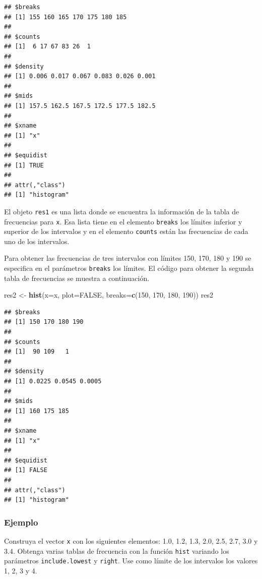 \documentclass[10pt,]{krantz}
\makeatletter
\newenvironment{Shaded}{\begin{snugshade}}{\end{snugshade}}
\newcommand{\KeywordTok}[1]{\textcolor[rgb]{0.13,0.29,0.53}{\textbf{#1}}}
\newcommand{\DataTypeTok}[1]{\textcolor[rgb]{0.13,0.29,0.53}{#1}}
\newcommand{\DecValTok}[1]{\textcolor[rgb]{0.00,0.00,0.81}{#1}}
\newcommand{\StringTok}[1]{\textcolor[rgb]{0.31,0.60,0.02}{#1}}
\newcommand{\OtherTok}[1]{\textcolor[rgb]{0.56,0.35,0.01}{#1}}
\newcommand{\NormalTok}[1]{#1}
\newenvironment{kframe}{%
\medskip{}
\setlength{\fboxsep}{.8em}
 \def\at@end@of@kframe{}%
 \ifinner\ifhmode%
  \def\at@end@of@kframe{\end{minipage}}%
  \begin{minipage}{\columnwidth}%
 \fi\fi%
 \def\FrameCommand##1{\hskip\@totalleftmargin \hskip-\fboxsep
 \colorbox{shadecolor}{##1}\hskip-\fboxsep
     \hskip-\linewidth \hskip-\@totalleftmargin \hskip\columnwidth}%
 \MakeFramed {\advance\hsize-\width
   \@totalleftmargin\z@ \linewidth\hsize
   \@setminipage}}%
 {\par\unskip\endMakeFramed%
 \at@end@of@kframe}
\renewenvironment{Shaded}{\begin{kframe}}{\end{kframe}}
\makeatother
\begin{document}
\begin{verbatim}
## $breaks
## [1] 155 160 165 170 175 180 185
## 
## $counts
## [1]  6 17 67 83 26  1
## 
## $density
## [1] 0.006 0.017 0.067 0.083 0.026 0.001
## 
## $mids
## [1] 157.5 162.5 167.5 172.5 177.5 182.5
## 
## $xname
## [1] "x"
## 
## $equidist
## [1] TRUE
## 
## attr(,"class")
## [1] "histogram"
\end{verbatim}

El objeto \texttt{res1} es una lista donde se encuentra la información
de la tabla de frecuencias para \texttt{x}. Esa lista tiene en el
elemento \texttt{breaks} los límites inferior y superior de los
intervalos y en el elemento \texttt{counts} están las frecuencias de
cada uno de los intervalos.

Para obtener las frecuencias de tres intervalos con límites 150, 170,
180 y 190 se especifica en el parámetros \texttt{breaks} los límites. El
código para obtener la segunda tabla de frecuencias se muestra a
continuación.

\begin{Shaded}
\begin{Highlighting}[]
\NormalTok{res2 <-}\StringTok{ }\KeywordTok{hist}\NormalTok{(}\DataTypeTok{x=}\NormalTok{x, }\DataTypeTok{plot=}\OtherTok{FALSE}\NormalTok{, }
             \DataTypeTok{breaks=}\KeywordTok{c}\NormalTok{(}\DecValTok{150}\NormalTok{, }\DecValTok{170}\NormalTok{, }\DecValTok{180}\NormalTok{, }\DecValTok{190}\NormalTok{))}
\NormalTok{res2}
\end{Highlighting}
\end{Shaded}

\begin{verbatim}
## $breaks
## [1] 150 170 180 190
## 
## $counts
## [1]  90 109   1
## 
## $density
## [1] 0.0225 0.0545 0.0005
## 
## $mids
## [1] 160 175 185
## 
## $xname
## [1] "x"
## 
## $equidist
## [1] FALSE
## 
## attr(,"class")
## [1] "histogram"
\end{verbatim}

\subsubsection*{Ejemplo}\label{ejemplo-14}

Construya el vector \texttt{x} con los siguientes elementos: 1.0, 1.2,
1.3, 2.0, 2.5, 2.7, 3.0 y 3.4. Obtenga varias tablas de frecuencia con
la función \texttt{hist} variando los parámetros \texttt{include.lowest}
y \texttt{right}. Use como límite de los intervalos los valores 1, 2, 3
y 4.
\end{document}
